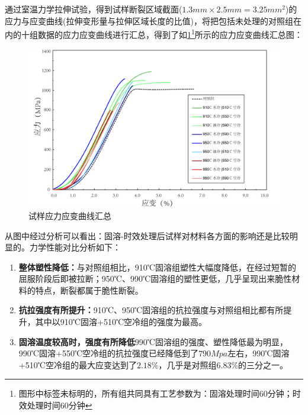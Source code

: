通过室温力学拉伸试验，得到试样断裂区域截面($ 1.3mm\times2.5mm=3.25mm^2 $)的应力与应变曲线(拉伸变形量与拉伸区域长度的比值)，将把包括未处理的对照组在内的十组数据的应力应变曲线进行汇总，得到了如\ref{fig:试样应力应变曲线汇总}\footnote{图形中标签未标明的，所有组共同具有工艺参数为：固溶处理时间60分钟；时效处理时间60分钟}所示的应力应变曲线汇总图：
\begin{figure}[h!]
	\centering
	\includegraphics[width=0.99\linewidth]{pic/试样应力应变曲线汇总min.png}
	\caption{试样应力应变曲线汇总}
	\label{fig:试样应力应变曲线汇总}
\end{figure}
从图中经过分析可以看出：固溶-时效处理后试样对材料各方面的影响还是比较明显的。力学性能对比分析如下：
\begin{enumerate}
	\item \textbf{整体塑性降低：}与对照组相比，910℃固溶组塑性大幅度降低，在经过短暂的屈服阶段后即被拉断；950℃、990℃固溶组的塑性更低，几乎呈现出来脆性材料的特点，断裂都属于脆性断裂。
	\item \textbf{抗拉强度有所提升：}910℃、950℃固溶组的抗拉强度与对照组相比都有所提升，其中以910℃固溶+510℃空冷组的强度为最高。
	\item \textbf{固溶温度较高时，强度有所降低}990℃固溶组的强度、塑性降低最为明显，990℃固溶+550℃空冷组的抗拉强度已经降低到了$ 790Mpa $左右，990℃固溶+510℃空冷组的最大应变达到了$ 2.18\% $，几乎是对照组$ 6.83\% $的三分之一。
\end{enumerate}

